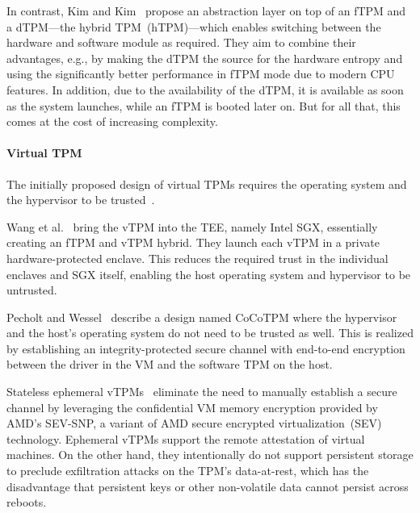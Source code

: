 In contrast, Kim and Kim~\cite{Kim2019} propose an abstraction layer on top of an \ac{fTPM} and a \ac{dTPM}---the hybrid TPM~(hTPM)---which enables switching between the hardware and software module as required.
They aim to combine their advantages, e.g., by making the dTPM the source for the hardware entropy and using the significantly better performance in \ac{fTPM} mode due to modern CPU features.
In addition, due to the availability of the \ac{dTPM}, it is available as soon as the system launches, while an \ac{fTPM} is booted later on.
But for all that, this comes at the cost of increasing complexity.

\paragraph{Virtual TPM}

The initially proposed design of virtual \acp{TPM} requires the operating system and the hypervisor to be trusted~\cite{268868}.

Wang et al.~\cite{Wang2019} bring the vTPM into the \ac{TEE}, namely Intel SGX, essentially creating an fTPM and vTPM hybrid.
They launch each vTPM in a private hardware-protected enclave.
This reduces the required trust in the individual enclaves and SGX itself, enabling the host operating system and hypervisor to be untrusted.

Pecholt and Wessel~\cite{Pecholt2022} describe a design named CoCoTPM where the hypervisor and the host's operating system do not need to be trusted as well.
This is realized by establishing an integrity-protected secure channel with end-to-end encryption between the driver in the VM and the software TPM on the host.

Stateless ephemeral vTPMs~\cite{Narayanan2023} eliminate the need to manually establish a secure channel by leveraging the confidential VM memory encryption provided by AMD's SEV-SNP, a variant of AMD secure encrypted virtualization~(SEV) technology.
Ephemeral vTPMs support the remote attestation of virtual machines.
On the other hand, they intentionally do not support persistent storage to preclude exfiltration attacks on the TPM's data-at-rest, which has the disadvantage that persistent keys or other non-volatile data cannot persist across reboots.


